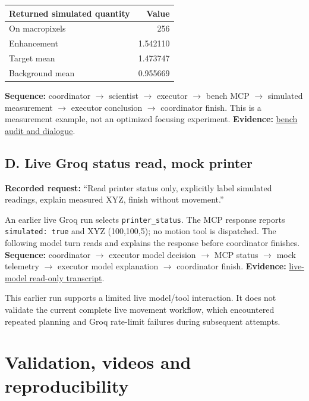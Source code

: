 \documentclass[11pt,a4paper]{article}
\newcommand{\code}[1]{\texttt{\small #1}}
\newcommand{\evidence}[2]{\href{https://github.com/Arenananyan/photonicsai-homework-3/tree/main/docs/evidence/#1}{#2}}
\begin{document}
\begin{tabularx}{\linewidth}{@{}Xr@{}}\toprule
\textbf{Returned simulated quantity} & \textbf{Value}\\\midrule
On macropixels &256\\
Enhancement &1.542110\\
Target mean &1.473747\\
Background mean &0.955669\\\bottomrule
\end{tabularx}
\textbf{Sequence:} coordinator $\rightarrow$ scientist $\rightarrow$ executor
$\rightarrow$ bench MCP $\rightarrow$ simulated measurement $\rightarrow$
executor conclusion $\rightarrow$ coordinator finish.
This is a measurement example, not an optimized focusing experiment.
\textbf{Evidence:} \evidence{simulated-optical-bench}{bench audit and dialogue}.

\subsection{D. Live Groq status read, mock printer}
\textbf{Recorded request:} ``Read printer status only, explicitly label simulated
readings, explain measured XYZ, finish without movement.''

An earlier live Groq run selects \code{printer\_status}. The MCP response reports
\code{simulated: true} and XYZ (100,100,5); no motion tool is dispatched. The
following model turn reads and explains the response before coordinator finishes.
\textbf{Sequence:} coordinator $\rightarrow$ executor model decision $\rightarrow$
MCP status $\rightarrow$ mock telemetry $\rightarrow$ executor model explanation
$\rightarrow$ coordinator finish.
\textbf{Evidence:} \evidence{live-groq-mock-status}{live-model read-only transcript}.

This earlier run supports a limited live model/tool interaction. It does not
validate the current complete live movement workflow, which encountered repeated
planning and Groq rate-limit failures during subsequent attempts.

\newpage
\section{Validation, videos and reproducibility}
\end{document}
